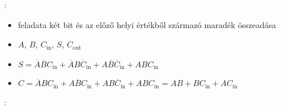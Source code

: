 \documentclass[main.tex]{subfiles}
\begin{document}
  \vspace{2em}
  {\large {}:}
  \begin{itemize}
    \item feladata két bit és az előző helyi
    értékből származó maradék összeadása

    \item {} $A$, $B$, $C_{\mathrm{in}}$,
     $S$, $C_{\mathrm{out}}$

    \item $S
    = \overline{A}\overline{B}{C}_\mathrm{in}
    + \overline{A}{B}\overline{C}_\mathrm{in}
    + {A}\overline{B}\overline{C}_\mathrm{in}
    + {A}{B}{C_\mathrm{in}}$

    \item $C
    = \overline{A}{B}{C}_\mathrm{in}
    + {A}\overline{B}{C}_\mathrm{in}
    + {A}{B}\overline{C}_\mathrm{in}
    + {A}{B}{C_\mathrm{in}}
    = AB + BC_\mathrm{in} + AC_\mathrm{in}$
  \end{itemize}

  \vspace{2em}
  {\large {}:}
\end{document}
